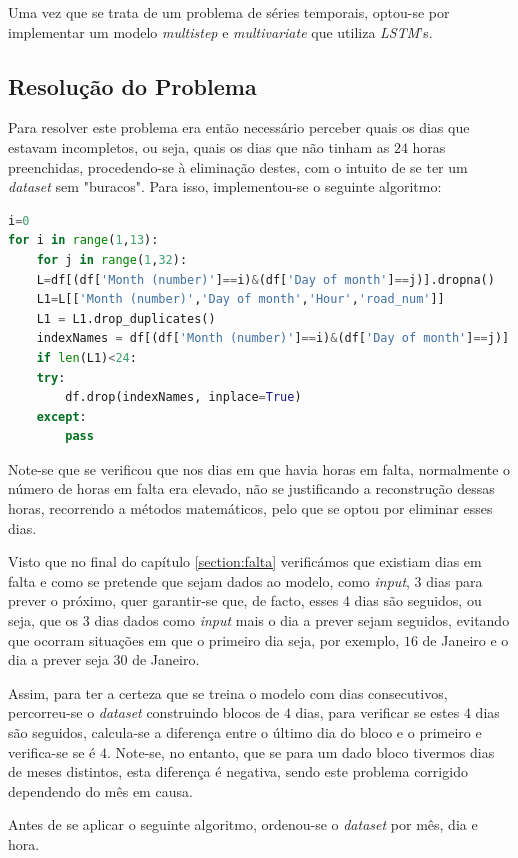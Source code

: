 \documentclass[a4paper, 12pt]{article}
\begin{document}
Uma vez que se trata de um problema de séries temporais, optou-se por implementar um modelo \textit{multistep} e \textit{multivariate} que utiliza \textit{LSTM}'s.

\subsection{Resolução do Problema}

Para resolver este problema era então necessário perceber quais os dias que estavam incompletos, ou seja, quais os dias que não tinham as $24$ horas preenchidas, procedendo-se à eliminação destes, com o intuito de se ter um \textit{dataset} sem "buracos". Para isso, implementou-se o seguinte algoritmo:

\begin{lstlisting}[language=Python]
i=0
for i in range(1,13):
	for j in range(1,32):
	L=df[(df['Month (number)']==i)&(df['Day of month']==j)].dropna()
	L1=L[['Month (number)','Day of month','Hour','road_num']]
	L1 = L1.drop_duplicates()
	indexNames = df[(df['Month (number)']==i)&(df['Day of month']==j)].index
	if len(L1)<24:
	try:
		df.drop(indexNames, inplace=True)
	except:
		pass
\end{lstlisting}

Note-se que se verificou que nos dias em que havia horas em falta, normalmente o número de horas em falta era elevado, não se justificando a reconstrução dessas horas, recorrendo a métodos matemáticos, pelo que se optou por eliminar esses dias.

Visto que no final do capítulo \ref{section:falta} verificámos que existiam dias em falta e como se pretende que sejam dados ao modelo, como \textit{input}, $3$ dias para prever o próximo, quer garantir-se que, de facto, esses $4$ dias são seguidos, ou seja, que os $3$ dias dados como \textit{input} mais o dia a prever sejam seguidos, evitando que ocorram situações em que o primeiro dia seja, por exemplo, $16$ de Janeiro e o dia a prever seja $30$ de Janeiro.

Assim, para ter a certeza que se treina o modelo com dias consecutivos, percorreu-se o \textit{dataset} construindo blocos de $4$ dias, para verificar se estes $4$ dias são seguidos, calcula-se a diferença entre o último dia do bloco e o primeiro e verifica-se se é $4$. Note-se, no entanto, que se para um dado bloco tivermos dias de meses distintos, esta diferença é negativa, sendo este problema corrigido dependendo do mês em causa.

Antes de se aplicar o seguinte algoritmo, ordenou-se o \textit{dataset} por mês, dia e hora.
\end{document}
